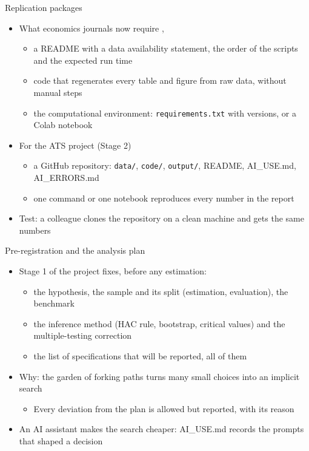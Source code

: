 \begin{frame}{Replication packages}
\itemsize{\small}
\begin{itemize}
    \item What economics journals now require , 
    \begin{itemize}
        \item a README with a data availability statement, the order of the scripts and the expected run time
        \item code that regenerates every table and figure from raw data, without manual steps
        \item the computational environment: \texttt{requirements.txt} with versions, or a Colab notebook
    \end{itemize}
    \item For the ATS project (Stage 2)
    \begin{itemize}
        \item a GitHub repository: \texttt{data/}, \texttt{code/}, \texttt{output/}, README, AI\_USE.md, AI\_ERRORS.md
        \item one command or one notebook reproduces every number in the report
    \end{itemize}
    \item Test: a colleague clones the repository on a clean machine and gets the same numbers
\end{itemize}
\end{frame}

\begin{frame}{Pre-registration and the analysis plan}
\itemsize{\small}
\begin{itemize}
    \item Stage 1 of the project fixes, before any estimation:
    \begin{itemize}
        \item the hypothesis, the sample and its split (estimation, evaluation), the benchmark
        \item the inference method (HAC rule, bootstrap, critical values) and the multiple-testing correction
        \item the list of specifications that will be reported, all of them
    \end{itemize}
    \item Why: the garden of forking paths turns many small choices into an implicit search
    \begin{itemize}
        \item Every deviation from the plan is allowed but reported, with its reason
    \end{itemize}
    \item An AI assistant makes the search cheaper: AI\_USE.md records the prompts that shaped a decision
\end{itemize}
\end{frame}


